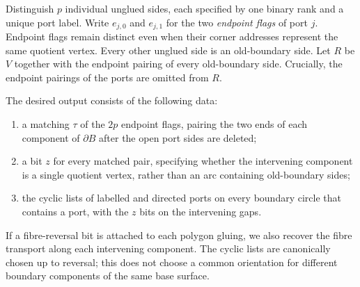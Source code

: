 Distinguish $p$ individual unglued sides, each specified by one binary
rank and a unique port label.  Write $e_{j,0}$ and $e_{j,1}$ for the two
\emph{endpoint flags} of port $j$.  Endpoint flags remain distinct even
when their corner addresses represent the same quotient vertex.
Every other unglued side is an old-boundary side.  Let $R$ be $V$ together
with the endpoint pairing of every old-boundary side.  Crucially, the
endpoint pairings of the ports are omitted from $R$.

The desired output consists of the following data:
\begin{enumerate}
\item a matching $\tau$ of the $2p$ endpoint flags, pairing the two ends of
  each component of $\partial B$ after the open port sides are deleted;
\item a bit $z$ for every matched pair, specifying whether the intervening
  component is a single quotient vertex, rather than an arc containing
  old-boundary sides;
\item the cyclic lists of labelled and directed ports on every boundary
  circle that contains a port, with the $z$ bits on the intervening gaps.
\end{enumerate}
If a fibre-reversal bit is attached to each polygon gluing, we also recover
the fibre transport along each intervening component.  The cyclic lists
are canonically chosen up to reversal; this does not choose a common
orientation for different boundary components of the same base surface.

